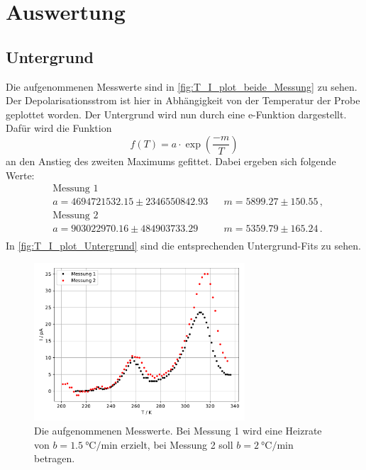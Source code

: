 \section{Auswertung}
\label{sec:Auswertung}

\subsection{Untergrund}
  Die aufgenommenen Messwerte sind in \autoref{fig:T_I_plot_beide_Messung} zu sehen.
  Der Depolarisationsstrom ist hier in Abhängigkeit von der Temperatur der Probe geplottet worden.
  Der Untergrund wird nun durch eine e-Funktion dargestellt.
  Dafür wird die Funktion
  \begin{equation*}
    f(T) = a \cdot \exp(\frac{-m}{T})
  \end{equation*}
  an den Anstieg des zweiten Maximums gefittet.
  Dabei ergeben sich folgende Werte:
  \begin{align*}
    &\text{Messung 1}\\
    &a =  4694721532.15 \pm 2346550842.93 &&  m = 5899.27 \pm 150.55 \, ,\\
    &\text{Messung 2}\\
    &a = 903022970.16 \pm 484903733.29 &&  m = 5359.79 \pm 165.24 \, .\\
  \end{align*}
  In \autoref{fig:T_I_plot_Untergrund} sind die entsprechenden Untergrund-Fits zu sehen.

\begin{figure}
  \centering
  \includegraphics[width = 0.7\textwidth]{build/plot.pdf}
  \caption{Die aufgenommenen Messwerte. Bei Messung 1 wird eine Heizrate von $b = \SI{1.5}{\celsius\per\minute}$ erzielt, 
  bei Messung 2 soll $b = \SI{2}{\celsius\per\minute}$ betragen.}
  \label{fig:T_I_plot_beide_Messung}
\end{figure} %

